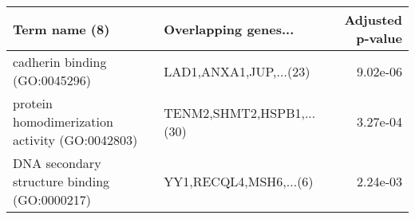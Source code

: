 \begin{tabular}{llr}
\toprule
                                 Term name (8) &      Overlapping genes... &  Adjusted p-value \\
\midrule
                 cadherin binding (GO:0045296) &    LAD1,ANXA1,JUP,...(23) &          9.02e-06 \\
protein homodimerization activity (GO:0042803) & TENM2,SHMT2,HSPB1,...(30) &          3.27e-04 \\
  DNA secondary structure binding (GO:0000217) &    YY1,RECQL4,MSH6,...(6) &          2.24e-03 \\
\bottomrule
\end{tabular}
